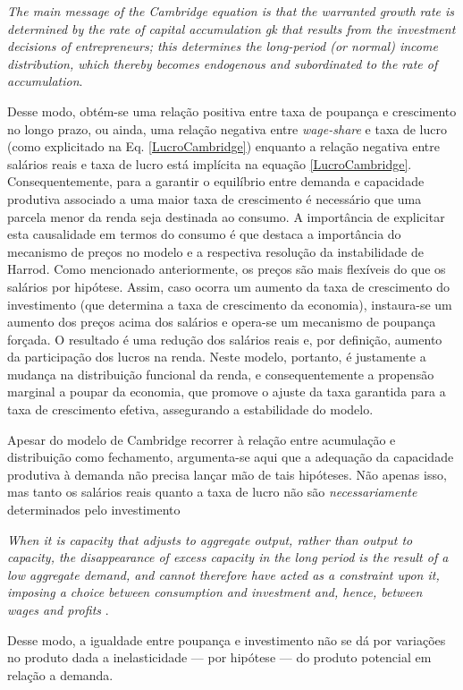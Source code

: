 \begin{citacao}
\textit{The main message of the Cambridge
equation is that the warranted growth rate is determined by the rate of capital
accumulation gk that results from the investment decisions of entrepreneurs; this
determines the long-period (or normal) income distribution, which thereby
becomes endogenous and subordinated to the rate of accumulation}. \cite[p.~158]{cesaratto_neo-kaleckian_2015}
\end{citacao}
Desse modo, obtém-se uma relação positiva entre taxa de poupança e crescimento no longo prazo, ou ainda, uma relação negativa entre \textit{wage-share} e taxa de lucro (como explicitado na Eq. \ref{LucroCambridge}) enquanto a relação negativa entre salários reais e taxa de lucro está implícita na equação \ref{LucroCambridge}. Consequentemente, para a garantir o equilíbrio entre demanda e capacidade produtiva associado a uma maior taxa de crescimento é necessário que uma parcela menor da renda seja destinada ao consumo. A importância de explicitar esta causalidade em termos do consumo é que destaca a importância do mecanismo de preços no modelo e a respectiva resolução da instabilidade de Harrod. Como mencionado anteriormente, os preços são mais flexíveis do que os salários por hipótese. Assim, caso ocorra um aumento da taxa de crescimento do investimento (que determina a taxa de crescimento da economia), instaura-se um aumento dos preços acima dos salários e opera-se um mecanismo de poupança forçada. O resultado é uma redução dos salários reais e, por definição, aumento da participação dos lucros na renda.  Neste modelo, portanto, é justamente a mudança na distribuição funcional da renda, e consequentemente a propensão marginal a poupar da economia, que promove o ajuste da taxa garantida para a taxa de crescimento efetiva, assegurando a estabilidade do modelo.

Apesar do modelo de Cambridge recorrer à relação entre acumulação e distribuição como fechamento, argumenta-se aqui que a adequação da capacidade
produtiva à demanda não precisa lançar mão de tais hipóteses.
Não apenas isso, mas tanto os salários reais quanto a taxa de lucro não são \textit{necessariamente} determinados pelo investimento

\begin{citacao}
\textit{When it is
capacity that adjusts to aggregate output, rather than output to
capacity, the disappearance of excess capacity in the long period is
the result of a low aggregate demand, and cannot therefore have
acted as a constraint upon it, imposing a choice between consumption
and investment and, hence, between wages and profits} \cite[p.~50]{halevi_notes_2014}.
\end{citacao}
Desse modo, a igualdade entre poupança e investimento não se dá por variações no produto dada a inelasticidade --- por hipótese --- do produto potencial em relação a demanda.


